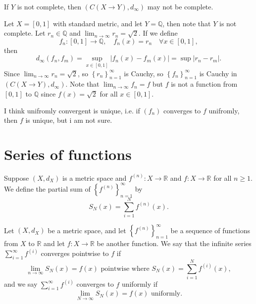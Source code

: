 \begin{eg}
    If \(Y\) is not complete, then \(\left( C(X \to Y), d_\infty  \right) \) may not be complete.
\end{eg}
\begin{explanation}
    Let \(X = [0, 1]\) with standard metric, and let \(Y = \mathbb{Q} \), then note that \(Y\) is not complete. Let \(r_n \in \mathbb{Q} \) and \(\lim_{n \to \infty} r_n = \sqrt{2}  \). If we define 
    \[
        f_n:[0, 1] \to \mathbb{Q}, \quad f_n(x) = r_n \quad \forall x \in [0, 1],
    \] then 
    \[
        d_\infty \left( f_n, f_m \right) = \sup _{x \in [0, 1]} \left\vert f_n(x) - f_m(x) \right\vert = \sup \left\vert r_n - r_m \right\vert.
    \]
    Since \(\lim_{n \to \infty} r_n = \sqrt{2}  \), so \(\left\{ r_n \right\}_{n=1}^{\infty}  \) is Cauchy, so \(\left\{ f_n \right\}_{n=1}^{\infty}  \) is Cauchy in \(\left( C(X \to Y), d_\infty  \right) \). Note that \(\lim_{n \to \infty} f_n = f \) but \(f\) is not a function from \([0, 1]\) to \(\mathbb{Q} \) since \(f(x) = \sqrt{2} \) for all \(x \in [0, 1]\).   
\end{explanation}

\begin{note}
    I think unifromly convergent is unique, i.e. if \(\left( f_n \right) \) converges to \(f\) unifromly, then \(f\) is unique, but i am not sure.  
\end{note}
\section{Series of functions}
Suppose \((X, d_X)\) is a metric space and \(f^{(n)}:X \to \mathbb{R} \) and \(f:X \to \mathbb{R} \) for all \(n \ge 1\). We define the partial sum of \(\left\{ f^{(n)} \right\}_{n=1}^{\infty}  \) by 
\[
    S_N(x) = \sum_{i=1}^N f^{(n)}(x).
\]  

\begin{definition}
    Let \((X, d_X)\) be a metric space, and let \(\left\{ f^{(n)} \right\}_{n=1}^{\infty}  \) be a sequence of functions from \(X\) to \(\mathbb{R} \) and let \(f: X \to \mathbb{R} \) be another function. We say that the infinite series \(\sum_{i=1}^{\infty} f^{(i)} \) converges pointwise to \(f\) if 
    \[
        \lim_{n \to \infty} S_N(x) = f(x) \text{ pointwise where } S_N(x) = \sum_{i=1}^N f^{(i)}(x),   
    \]       
    and we say \(\sum_{i=1}^{\infty} f^{(i)} \) converges to \(f\) uniformly if 
    \[
        \lim_{N \to \infty} S_N(x) = f(x) \text{ uniformly.}  
    \] 
\end{definition}

